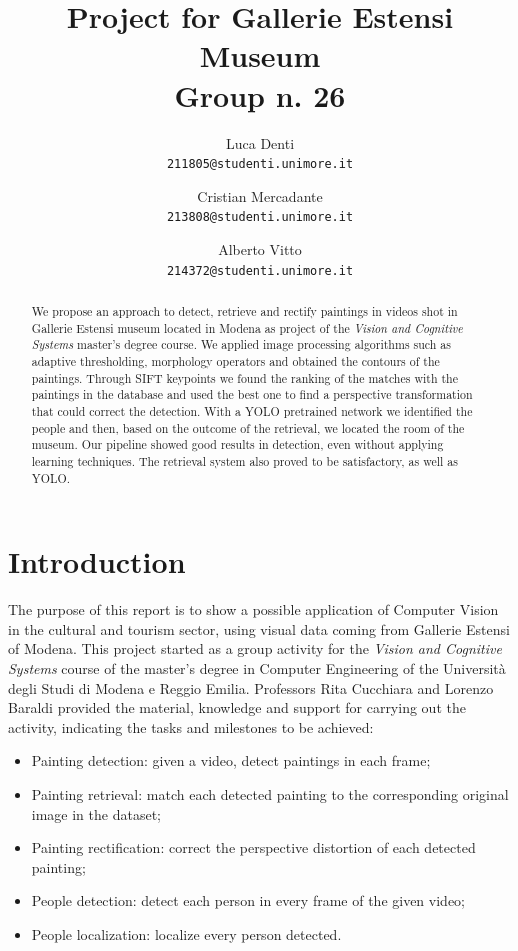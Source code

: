 \documentclass[10pt,twocolumn,letterpaper]{article}
\begin{document}
\title{Project for Gallerie Estensi Museum\\
\large Group n. 26}

\author{
Luca Denti\\
{\tt\small 211805@studenti.unimore.it}
\and
Cristian Mercadante\\
{\tt\small 213808@studenti.unimore.it}
\and
Alberto Vitto\\
{\tt\small 214372@studenti.unimore.it}
}

\maketitle

\begin{abstract}
We propose an approach to detect, retrieve and rectify paintings in videos shot in Gallerie Estensi museum located in Modena as project of the \emph{Vision and Cognitive Systems} master's degree course. We applied image processing algorithms such as adaptive thresholding, morphology operators and obtained the contours of the paintings. Through SIFT keypoints we found the ranking of the matches with the paintings in the database and used the best one to find a perspective transformation that could correct the detection. With a YOLO pretrained network we identified the people and then, based on the outcome of the retrieval, we located the room of the museum. Our pipeline showed good results in detection, even without applying learning techniques. The retrieval system also proved to be satisfactory, as well as YOLO.
\end{abstract}


\section{Introduction}
\label{sec:Introduction}
The purpose of this report is to show a possible application of Computer Vision in the cultural and tourism sector, using visual data coming from Gallerie Estensi of Modena. This project started as a group activity for the \textit{Vision and Cognitive Systems} course of the master's degree in Computer Engineering of the Università degli Studi di Modena e Reggio Emilia. Professors Rita Cucchiara and Lorenzo Baraldi provided the material, knowledge and support for carrying out the activity, indicating the tasks and milestones to be achieved:
\begin{itemize}
    \item Painting detection: given a video, detect paintings in each frame;
    \item Painting retrieval: match each detected painting to the corresponding original image in the dataset;
    \item Painting rectification: correct the perspective distortion of each detected painting;
    \item People detection: detect each person in every frame of the given video;
    \item People localization: localize every person detected.
\end{itemize}
\end{document}
